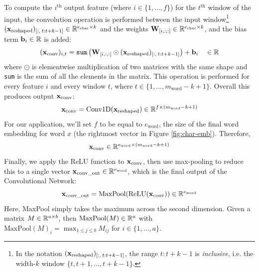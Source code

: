 \begin{enumerate}[(a)]
    To compute the $i^\text{th}$ output feature (where $i \in \{1,\dots,f\}$) for the $t^\text{th}$ window of the input, the convolution operation is performed between the input window\footnote{In the notation $(\mathbf{x}_\text{reshaped})_{[:, \> t:t+k-1]}$, the range $t:t+k-1$ is \textit{inclusive}, i.e. the width-$k$ window $\{t,t+1,\dots,t+k-1\}$.} $(\mathbf{x}_\text{reshaped})_{[:, \> t:t+k-1]} \in \mathbb{R}^{e_\text{char} \times k}$ and the weights $\mathbf{W}_{[i, :, :]} \in \mathbb{R}^{e_\text{char} \times k}$, and the bias term $\mathbf{b}_i \in \mathbb{R}$ is added:
    \begin{equation}
        (\mathbf{x}_\text{conv})_{i, t} = \texttt{sum} \left( \mathbf{W}_{[i, :, :]} \odot (\mathbf{x}_\text{reshaped})_{[:, \> t:t+k-1]} \right) + \mathbf{b}_i \quad \in \mathbb{R}
    \end{equation}
    where $\odot$ is elementwise multiplication of two matrices with the same shape and \texttt{sum} is the sum of all the elements in the matrix.
    This operation is performed for every feature $i$ and every window $t$, where $t \in \{1,\dots,m_\text{word}-k+1\}$. Overall this produces output $\mathbf{x}_\text{conv}$: 
    \begin{equation}
        \mathbf{x}_{\text{conv}} = \text{Conv1D}(\mathbf{x}_{\text{reshaped}})
        \in \mathbb{R}^{f \times (m_\text{word}-k+1)}
    \end{equation}
    For our application, we'll set $f$ to be equal to $e_\text{word}$, the size of the final word embedding for word $x$ (the rightmost vector in Figure \ref{fig:char-emb}). Therefore, 
    \begin{equation}
        \mathbf{x}_{\text{conv}} \in \mathbb{R}^{e_\text{word} \times (m_\text{word}-k+1)}
    \end{equation}
    Finally, we apply the ReLU function to $\mathbf{x}_{\text{conv}}$, then use max-pooling to reduce this to a single vector $\mathbf{x}_{\text{conv\_out}} \in \mathbb{R}^{e_\text{word}}$, which is the final output of the Convolutional Network:
    \begin{equation}
        \mathbf{x}_\text{conv\_out} = \text{MaxPool}( \text{ReLU}(\mathbf{x}_{\text{conv}}))  \in \mathbb{R}^{e_\text{word}}
    \end{equation}
    Here, MaxPool simply takes the maximum across the second dimension. Given a matrix $M \in \mathbb{R}^{a\times b}$, then $\text{MaxPool}(M)\in \mathbb{R}^a$ with $\text{MaxPool}(M)_i = \max_{1\le j \le b} M_{ij}$ for $i \in \{1,\dots,a\}$.


\end{enumerate}

